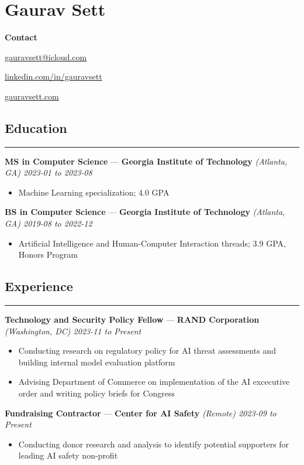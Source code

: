 \documentclass[10pt]{article}
\newcommand{\resumeHeading}[1]{
    \subsection*{#1}
    \hrule
    \vspace*{5pt}
}
\newcommand{\resumeSubHeading}[5]{
    \vspace*{5pt}
    \textbf{#1} — \textbf{#2} \textsl{(#3) \hfill #4 to #5}
}
\begin{document}
\section*{Gaurav Sett}

\textbf{Contact}
\begin{itemize*}[label=$|$]
    \item \href{mailto:gauravsett@icloud.com}{gauravsett@icloud.com}
    \item \href{https://linkedin.com/in/gauravsett}{linkedin.com/in/gauravsett}
    \item \href{https://gauravsett.com}{gauravsett.com}
\end{itemize*}



\resumeHeading{Education}

\resumeSubHeading
    {MS in Computer Science}
    {Georgia Institute of Technology}
    {Atlanta, GA}
    {2023-01}
    {2023-08}
\begin{itemize}
    \item Machine Learning specialization; 4.0 GPA
\end{itemize}

\resumeSubHeading
    {BS in Computer Science}
    {Georgia Institute of Technology}
    {Atlanta, GA}
    {2019-08}
    {2022-12}
\begin{itemize}
    \item Artificial Intelligence and Human-Computer Interaction threads; 3.9 GPA, Honors Program
\end{itemize}



\resumeHeading{Experience \vspace{-2.5pt}}

\resumeSubHeading
    {Technology and Security Policy Fellow}
    {RAND Corporation}
    {Washington, DC}
    {2023-11}
    {Present}
\begin{itemize}
    \item Conducting research on regulatory policy for AI threat assessments and building internal model evaluation platform
    \item Advising Department of Commerce on implementation of the AI excecutive order and writing policy briefs for Congress
\end{itemize}

\resumeSubHeading
    {Fundraising Contractor}
    {Center for AI Safety}
    {Remote}
    {2023-09}
    {Present}
\begin{itemize}
    \item Conducting donor research and analysis to identify potential supporters for leading AI safety non-profit
\end{itemize}
\end{document}

